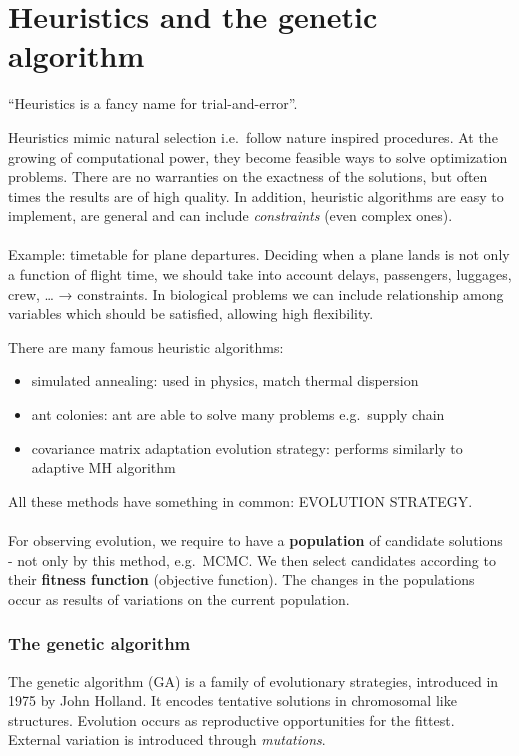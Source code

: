 \graphicspath{{chapters/12/images/}}
\chapter{Heuristics and the genetic algorithm}

``Heuristics is a fancy name for trial-and-error''.

Heuristics mimic natural selection i.e.~follow nature inspired
procedures. At the growing of computational power, they become feasible
ways to solve optimization problems. There are no warranties on the
exactness of the solutions, but often times the results are of high
quality. In addition, heuristic algorithms are easy to implement, are
general and can include \emph{constraints} (even complex ones).
\\
\\
\noindent
Example: timetable for plane departures. Deciding when a plane lands is
not only a function of flight time, we should take into account delays,
passengers, luggages, crew, \ldots{} → constraints. In biological
problems we can include relationship among variables which should be
satisfied, allowing high flexibility.

There are many famous heuristic algorithms:

\begin{itemize}
\tightlist
\item
  simulated annealing: used in physics, match thermal dispersion
\item
  ant colonies: ant are able to solve many problems e.g.~supply chain
\item
  covariance matrix adaptation evolution strategy: performs similarly to
  adaptive MH algorithm
\end{itemize}
\noindent
All these methods have something in common: EVOLUTION STRATEGY.
\\
\\
\noindent
For observing evolution, we require to have a \textbf{population} of
candidate solutions - not only by this method, e.g.~MCMC. We then select
candidates according to their \textbf{fitness function} (objective
function). The changes in the populations occur as results of variations
on the current population.


\subsection{The genetic algorithm}

The genetic algorithm (GA) is a family of evolutionary strategies,
introduced in 1975 by John Holland. It encodes tentative solutions in
chromosomal like structures. Evolution occurs as reproductive
opportunities for the fittest. External variation is introduced through
\emph{mutations}.

